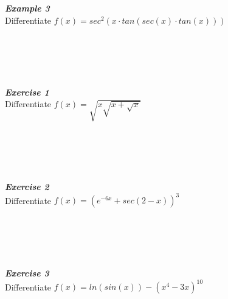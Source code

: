 \documentclass[12px]{article}
\begin{document}
\begin{enumerate}
            \\
            \\
            \\
            \\
            \textbf{\textit{Example 3}}\\
            Differentiate $f(x)=sec^2(x\cdot tan(sec(x)\cdot tan(x)))$\\
            \\
            \\
            \\
            \\
            \\
            \textbf{\textit{Exercise 1}}\\
            Differentiate $f(x)=\sqrt{x\sqrt{x+\sqrt{x}}}$\\
            \\
            \\
            \\
            \\
            \\
            \textbf{\textit{Exercise 2}}\\
            Differentiate $f(x)=(e^{-6x}+sec(2-x))^3$\\
            \\
            \\
            \\
            \\
            \\
            \textbf{\textit{Exercise 3}}\\
            Differentiate $f(x)=ln(sin(x))-(x^4-3x)^{10}$
            \\
            \\
            \\
            \\
            \\
\end{enumerate}
\end{document}
